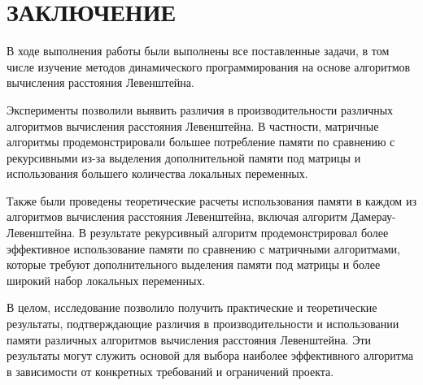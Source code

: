 \chapter*{ЗАКЛЮЧЕНИЕ}

В ходе выполнения работы были выполнены все поставленные задачи, в том числе изучение методов динамического программирования на основе алгоритмов вычисления расстояния Левенштейна.

Эксперименты позволили выявить различия в производительности различных алгоритмов вычисления расстояния Левенштейна. В частности, матричные алгоритмы продемонстрировали большее потребление памяти по сравнению с рекурсивными из-за выделения дополнительной памяти под матрицы и использования большего количества локальных переменных.

Также были проведены теоретические расчеты использования памяти в каждом из алгоритмов вычисления расстояния Левенштейна, включая алгоритм Дамерау-Левенштейна. В результате рекурсивный алгоритм продемонстрировал более эффективное использование памяти по сравнению с матричными алгоритмами, которые требуют дополнительного выделения памяти под матрицы и более широкий набор локальных переменных.

В целом, исследование позволило получить практические и теоретические результаты, подтверждающие различия в производительности и использовании памяти различных алгоритмов вычисления расстояния Левенштейна. Эти результаты могут служить основой для выбора наиболее эффективного алгоритма в зависимости от конкретных требований и ограничений проекта.
\pagebreak